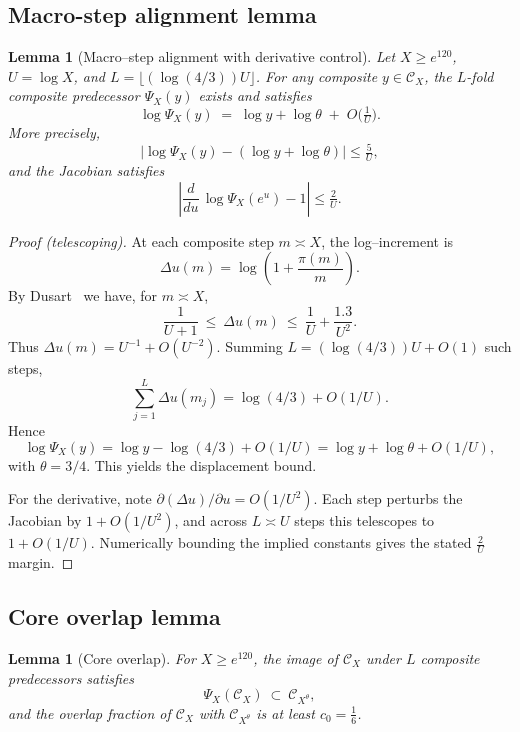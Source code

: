 \documentclass[11pt]{article}
\theoremstyle{plain}
\newtheorem{lemma}[theorem]{Lemma}
\theoremstyle{definition}
\theoremstyle{remark}
\begin{document}
\subsection{Macro-step alignment lemma}

\begin{lemma}[Macro--step alignment with derivative control]\label{lem:macro}
Let $X \geq e^{120}$, $U=\log X$, and $L=\lfloor (\log(4/3))U\rfloor$. 
For any composite $y \in \mathcal C_X$, the $L$-fold composite predecessor $\Psi_X(y)$ exists and satisfies
\[
\log \Psi_X(y) \;=\; \log y + \log \theta \;+\; O\!\Big(\tfrac{1}{U}\Big).
\]
More precisely,
\[
\Big|\log \Psi_X(y) - (\log y + \log \theta)\Big| \leq \tfrac{5}{U},
\]
and the Jacobian satisfies
\[
\left|\frac{d}{du}\,\log \Psi_X(e^u) - 1 \right| \leq \tfrac{2}{U}.
\]
\end{lemma}

\begin{proof}[Proof (telescoping)]
At each composite step $m\asymp X$, the log--increment is
\[
\Delta u(m) = \log\!\left(1+\frac{\pi(m)}{m}\right).
\]
By Dusart~\cite[Theorem~1.10]{Dusart2010} we have, for $m\asymp X$,
\[
\frac{1}{U+1}\ \leq\ \Delta u(m)\ \leq\ \frac{1}{U}+\frac{1.3}{U^2}.
\]
Thus $\Delta u(m) = U^{-1}+O(U^{-2})$. Summing $L=(\log(4/3))U+O(1)$ such steps,
\[
\sum_{j=1}^L \Delta u(m_j) = \log(4/3) + O(1/U).
\]
Hence
\[
\log \Psi_X(y) = \log y - \log(4/3)+O(1/U) = \log y + \log \theta + O(1/U),
\]
with $\theta=3/4$. This yields the displacement bound.

For the derivative, note $\partial(\Delta u)/\partial u = O(1/U^2)$. Each step perturbs the Jacobian by $1+O(1/U^2)$, and across $L\asymp U$ steps this telescopes to $1+O(1/U)$. Numerically bounding the implied constants gives the stated $\tfrac{2}{U}$ margin.
\end{proof}

\subsection{Core overlap lemma}

\begin{lemma}[Core overlap]\label{lem:overlap}
For $X \geq e^{120}$, the image of $\mathcal C_X$ under $L$ composite predecessors satisfies
\[
\Psi_X(\mathcal C_X)\ \subset\ \mathcal C_{X^\theta},
\]
and the overlap fraction of $\mathcal C_X$ with $\mathcal C_{X^\theta}$ is at least $c_0=\tfrac{1}{6}$.
\end{lemma}
\end{document}
